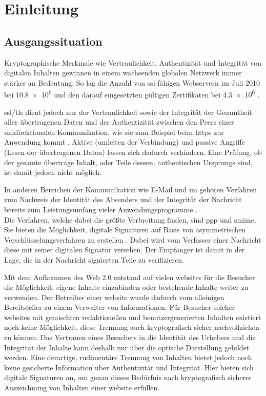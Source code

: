
\chapter{Einleitung}
\label{chap:Einleitung}

\section{Ausgangssituation}
\label{sec:Einleitung:ausgangssituation}
Kryptographische Merkmale wie Vertraulichkeit, Authentizität und Integrität von digitalen Inhalten gewinnen in einem wachsenden globalen Netzwerk immer
stärker an Bedeutung. So lag die Anzahl von \gls{ssl}-fähigen Webservern im Juli 2010 bei \num{10.8e6} und den darauf eingesetzten gültigen Zertifikaten bei
\num{4.3e6} \cite{ssliverse:eff}.

\gls{ssl}/\gls{tls} dient jedoch nur der Vertraulichkeit sowie der Integrität der Gesamtheit aller übertragenen Daten und der Authentizität zwischen den Peers
einer unidirektionalen  Kommunikation, wie sie zum Beispiel beim \gls{https} zur Anwendung kommt \cite{kits}. Aktive (umleiten der Verbindung) und passive
Angriffe (Lesen der übertragenen Daten) lassen sich dadurch verhindern. Eine Prüfung, ob der gesamte übertrage Inhalt, oder Teile dessen, authentischen
Ursprungs sind, ist damit jedoch nicht möglich.

In anderen Bereichen der Kommunikation wie E-Mail und \gls{im} gehören Verfahren zum Nachweis der Identität des Absenders und der Integrität der Nachricht
bereits zum Leistungsumfang vieler Anwendungsprogramme \cite{2719799020071101}.\\
Die Verfahren, welche dabei die größte Verbreitung finden, sind \gls{pgp} und \gls{smime}. Sie bieten die Möglichkeit, digitale Signaturen auf Basis von asymmetrischen
Verschlüsselungsverfahren zu erstellen \cite{kits}. Dabei wird vom Verfasser einer Nachricht diese mit seiner digitalen Signatur versehen. Der Empfänger ist damit
in der Lage, die in der Nachricht signierten Teile zu verifizieren.

Mit dem Aufkommen des Web 2.0 entstand auf vielen \glspl{website} für die Besucher die Möglichkeit, eigene Inhalte einzubinden oder bestehende Inhalte weiter zu
verwenden. Der Betreiber einer \gls{website} wurde dadurch vom alleinigen Bereitsteller zu einem Verwalter von Informationen. Für Besucher solcher
\glspl{website} mit gemischten redaktionellen und benutzergenerierten Inhalten existiert noch keine Möglichkeit, diese Trennung auch kryptografisch sicher
nachvollziehen zu können. Das Vertrauen eines Besuchers in die Identität des Urhebers und die Integrität der Inhalte kann deshalb nur über die optische
Darstellung gebildet werden. Eine derartige, rudimentäre Trennung von Inhalten bietet jedoch noch keine gesicherte Information über Authentizität und
Integrität. Hier bieten sich digitale Signaturen an, um genau dieses Bedürfnis nach kryptografisch sicherer Auszeichnung von Inhalten einer \gls{website} erfüllen.

